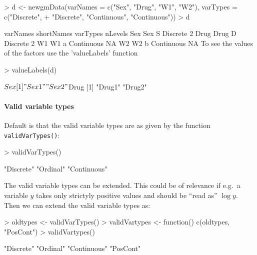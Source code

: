 \documentclass{article}
\def\code#1{\texttt{#1}}
\begin{document}
\footnotesize 
\begin{Schunk}
\begin{Sinput}
> d <- newgmData(varNames = c("Sex", "Drug", "W1", "W2"), varTypes = c("Discrete", 
+     "Discrete", "Continuous", "Continuous"))
> d
\end{Sinput}
\begin{Soutput}
     varNames shortNames   varTypes nLevels
Sex       Sex          S   Discrete       2
Drug     Drug          D   Discrete       2
W1         W1          a Continuous      NA
W2         W2          b Continuous      NA
To see the values of the factors use the 'valueLabels' function
\end{Soutput}
\begin{Sinput}
> valueLabels(d)
\end{Sinput}
\begin{Soutput}
$Sex
[1] "Sex1" "Sex2"

$Drug
[1] "Drug1" "Drug2"
\end{Soutput}
\end{Schunk}
\normalsize


\paragraph{Valid variable types}

Default is that the valid variable types are as given by the function 
\code{validVarTypes()}:
\footnotesize
\begin{Schunk}
\begin{Sinput}
> validVarTypes()
\end{Sinput}
\begin{Soutput}
[1] "Discrete"   "Ordinal"    "Continuous"
\end{Soutput}
\end{Schunk}
\normalsize
The valid variable types can be extended. This could  be of relevance if
e.g.\ a variable $y$ takes only strictyly positive values and 
should  be ``read as'' $\log
y$. Then we can extend the valid variable types as:
\footnotesize 
\begin{Schunk}
\begin{Sinput}
> oldtypes <- validVarTypes()
> validVartypes <- function() c(oldtypes, "PosCont")
> validVartypes()
\end{Sinput}
\begin{Soutput}
[1] "Discrete"   "Ordinal"    "Continuous" "PosCont"   
\end{Soutput}
\end{Schunk}
\normalsize
\end{document}
